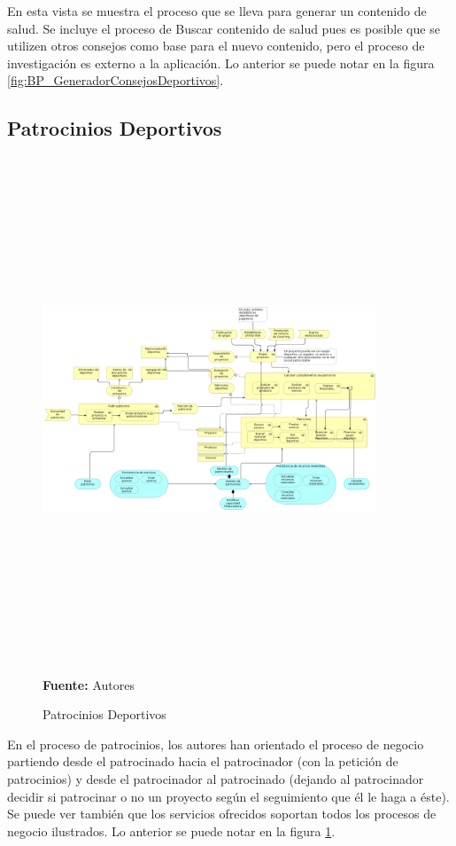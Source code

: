 En esta vista se muestra el proceso que se lleva para generar un contenido de salud. Se incluye el proceso de Buscar contenido de salud pues es posible que se utilizen otros consejos como base para el nuevo contenido, pero el proceso de investigación es externo a la aplicación. Lo anterior se puede notar en la figura \ref{fig:BP_GeneradorConsejosDeportivos}.

\subsection{Patrocinios Deportivos}

\begin{figure}[!htb]
  \begin{center}
    \includegraphics[angle=90,width=10cm,height=15cm]{./imagenes/Archimate/vistas/business_process/patrociniosdeportivos.png}
    \caption{Patrocinios Deportivos}
    \label{fig:bp_patrocinios_deportivos}
    \textbf{Fuente:}  Autores \\
  \end{center}
\end{figure}

En el proceso de patrocinios, los autores han orientado el proceso de negocio partiendo desde el patrocinado hacia el patrocinador (con la petición de patrocinios) y desde el patrocinador al patrocinado (dejando al patrocinador decidir si patrocinar o no un proyecto según el seguimiento que él le haga a éste). Se puede ver también que los servicios ofrecidos soportan todos los procesos de negocio ilustrados. Lo anterior se puede notar en la figura \ref{fig:bp_patrocinios_deportivos}.

